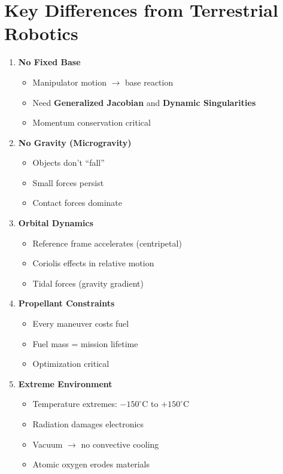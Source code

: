 \documentclass[11pt,a4paper]{article}
\begin{document}
\section{Key Differences from Terrestrial Robotics}

\begin{enumerate}
    \item \textbf{No Fixed Base}
    \begin{itemize}
        \item Manipulator motion $\rightarrow$ base reaction
        \item Need \textbf{Generalized Jacobian} and \textbf{Dynamic Singularities}
        \item Momentum conservation critical
    \end{itemize}

    \item \textbf{No Gravity (Microgravity)}
    \begin{itemize}
        \item Objects don't ``fall''
        \item Small forces persist
        \item Contact forces dominate
    \end{itemize}

    \item \textbf{Orbital Dynamics}
    \begin{itemize}
        \item Reference frame accelerates (centripetal)
        \item Coriolis effects in relative motion
        \item Tidal forces (gravity gradient)
    \end{itemize}

    \item \textbf{Propellant Constraints}
    \begin{itemize}
        \item Every maneuver costs fuel
        \item Fuel mass = mission lifetime
        \item Optimization critical
    \end{itemize}

    \item \textbf{Extreme Environment}
    \begin{itemize}
        \item Temperature extremes: $-150^\circ$C to $+150^\circ$C
        \item Radiation damages electronics
        \item Vacuum $\rightarrow$ no convective cooling
        \item Atomic oxygen erodes materials
    \end{itemize}


\end{enumerate}
\end{document}
